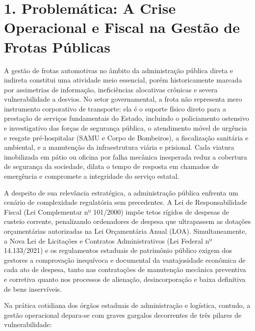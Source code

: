 \documentclass[10pt,a4paper,journal]{article}
\begin{document}
\section{1. Problemática: A Crise Operacional e Fiscal na Gestão de Frotas Públicas}
A gestão de frotas automotivas no âmbito da administração pública direta e indireta constitui uma atividade meio essencial, porém historicamente marcada por assimetrias de informação, ineficiências alocativas crônicas e severa vulnerabilidade a desvios. No setor governamental, a frota não representa mero instrumento corporativo de transporte: ela é o suporte físico direto para a prestação de serviços fundamentais do Estado, incluindo o policiamento ostensivo e investigativo das forças de segurança pública, o atendimento móvel de urgência e resgate pré-hospitalar (SAMU e Corpo de Bombeiros), a fiscalização sanitária e ambiental, e a manutenção da infraestrutura viária e prisional. Cada viatura imobilizada em pátio ou oficina por falha mecânica inesperada reduz a cobertura de segurança da sociedade, dilata o tempo de resposta em chamados de emergência e compromete a integridade do serviço estatal.

A despeito de sua relevância estratégica, a administração pública enfrenta um cenário de complexidade regulatória sem precedentes. A Lei de Responsabilidade Fiscal (Lei Complementar nº 101/2000) impõe tetos rígidos de despesas de custeio corrente, penalizando ordenadores de despesa que ultrapassem as dotações orçamentárias autorizadas na Lei Orçamentária Anual (LOA). Simultaneamente, a Nova Lei de Licitações e Contratos Administrativos (Lei Federal nº 14.133/2021) e os regulamentos estaduais de patrimônio público exigem dos gestores a comprovação inequívoca e documental da vantajosidade econômica de cada ato de despesa, tanto nas contratações de manutenção mecânica preventiva e corretiva quanto nos processos de alienação, desincorporação e baixa definitiva de bens inservíveis.

Na prática cotidiana dos órgãos estaduais de administração e logística, contudo, a gestão operacional depara-se com graves gargalos decorrentes de três pilares de vulnerabilidade:
\end{document}
